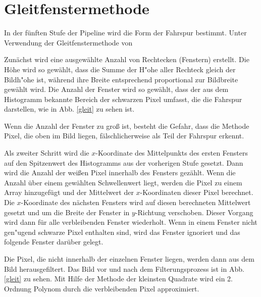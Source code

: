 \documentclass[arbeit=studie,oneside,BCOR=12mm]{ArbeitRST}
\begin{document}
\section{Gleitfenstermethode}

In der fünften Stufe der Pipeline wird die Form der Fahrspur bestimmt. Unter Verwendung
der Gleitfenstermethode von \cite{addison}

Zunächst wird eine ausgewählte Anzahl von Rechtecken (Fenstern) erstellt. Die
Höhe wird so gewählt, dass die Summe der H"ohe aller Rechteck gleich der
Bildh"ohe ist, während ihre Breite entsprechend proportional zur Bildbreite
gewählt wird. Die Anzahl der Fenster wird so gewählt, dass der aus dem
Histogramm bekannte Bereich der schwarzen Pixel umfasst, die die Fahrspur
darstellen, wie in Abb. \ref{gleit} zu sehen ist. 

Wenn die Anzahl der Fenster
zu groß ist, besteht die Gefahr, dass die Methode  Pixel, die oben im Bild
liegen, fälschlicherweise als Teil der Fahrspur erkennt. 

Als zweiter Schritt wird die $x$-Koordinate des Mittelpunkts des ersten Fensters auf den
Spitzenwert des Histogramms aus der vorherigen Stufe gesetzt. Dann wird die
Anzahl der weißen Pixel innerhalb des Fensters gezählt. Wenn die Anzahl über
einem gewählten Schwellenwert liegt, werden die Pixel zu einem Array
hinzugefügt und der Mittelwert der $x$-Koordinaten dieser Pixel berechnet. Die
$x$-Koordinate des nächsten Fensters wird auf diesen berechneten Mittelwert
gesetzt und um die Breite der Fenster in $y$-Richtung verschoben. Dieser
Vorgang wird dann für alle verbleibenden Fenster wiederholt. Wenn in einem
Fenster nicht gen"ugend schwarze Pixel enthalten sind, wird das Fenster
ignoriert und das folgende Fenster darüber gelegt.  

Die Pixel, die nicht innerhalb der einzelnen Fenster liegen, werden dann aus
dem Bild herausgefiltert. Das Bild vor und nach dem Filterungsprozess ist in
Abb. \ref{gleit} zu sehen. Mit Hilfe der Methode der kleinsten Quadrate wird ein
2. Ordnung Polynom durch die verbleibenden Pixel approximiert.
\end{document}
